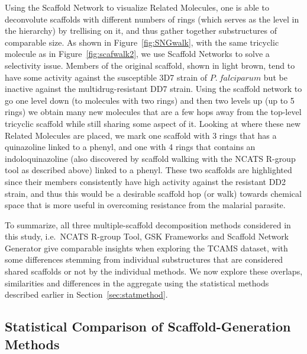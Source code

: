 \documentclass[journal=jacsat,manuscript=article]{achemso}
\newcommand*\fref[1]{Figure~\ref{fig:#1}}
\newcommand*\sref[1]{Section~\ref{sec:#1}}
\newcommand*\ie{i.e.~}
\begin{document}
Using the Scaffold Network to visualize Related Molecules, one is able to deconvolute scaffolds with different numbers of rings (which serves as the level in the hierarchy) by trellising on it, and thus gather together substructures of comparable size. As shown in \fref{SNGwalk}, with the same tricyclic molecule as in \fref{scafwalk2}, we use Scaffold Networks to solve a selectivity issue. Members of the original scaffold, shown in light brown, tend to have some activity against the susceptible 3D7 strain of $P.~falciparum$ but be inactive against the multidrug-resistant DD7 strain. Using the scaffold network to go one level down (to molecules with two rings) and then two levels up (up to 5 rings) we obtain many new molecules that are a few hops away from the top-level tricyclic scaffold while still sharing some aspect of it. Looking at where these new Related Molecules are placed, we mark one scaffold with 3 rings that has a quinazoline linked to a phenyl, and one with 4 rings that contains an indoloquinazoline (also discovered by scaffold walking with the NCATS R-group tool as described above) linked to a phenyl. These two scaffolds are highlighted since their members consistently have high activity against the resistant DD2 strain, and thus this would be a desirable scaffold hop (or walk) towards chemical space that is more useful in overcoming resistance from the malarial parasite.  

To summarize, all three multiple-scaffold decomposition methods considered in this study, \ie NCATS R-group Tool, GSK Frameworks  and Scaffold Network Generator give comparable insights when exploring the TCAMS dataset, with some differences stemming from individual substructures that are considered shared scaffolds or not by the individual methods.  We now explore these overlaps, similarities and differences in the aggregate using the statistical methods described earlier in \sref{statmethod}.

\subsection{Statistical Comparison of Scaffold-Generation Methods}\label{sec:statcomp}
\end{document}
